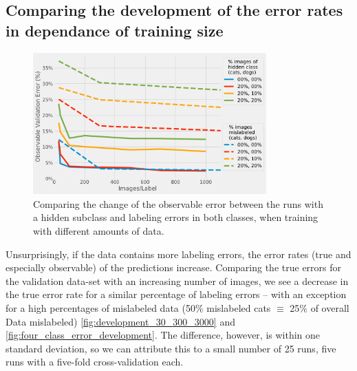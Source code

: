 \documentclass[a4paper,11pt]{scrartcl}
\theoremstyle{definition}
\begin{document}
\subsection[Comparison of different amounts of data]{Comparing the development of the error rates in dependance of training size}
\begin{figure}[htbp]
\centering
\includegraphics[width=0.8\textwidth]{Plots_5/Error_Evolution_hidden_vs_mislabeled.pdf}
\caption[Comparison between hidden class and labeling errors.]{Comparing the change of the observable error between the runs with a hidden subclass and labeling errors in both classes, when training with different amounts of data.}
\label{fig:compare_hidden_vs_mislabel}
\end{figure}


Unsurprisingly, if the data contains more labeling errors, the error rates (true and especially observable) of the predictions increase.
Comparing the true errors for the validation data-set with an increasing number of images, we see a decrease in the true error rate for a similar percentage of labeling errors -- with an exception for a high percentages of mislabeled data (50\% mislabeled cats $\equiv$ 25\% of overall Data mislabeled) \autoref{fig:development_30_300_3000} and \autoref{fig:four_class_error_development}.
The difference, however, is within one standard deviation, so we can attribute this to a small number of 25 runs, five runs with a five-fold cross-validation each.
\end{document}
